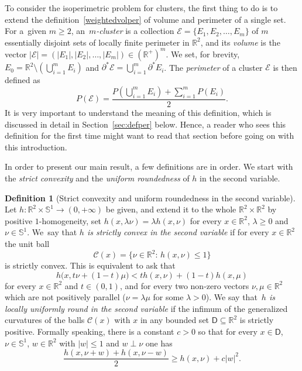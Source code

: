 \documentclass[10pt]{amsart}
\newcommand\R{\mathbb{R}}
\renewcommand\S{\mathbb{S}}
\newcommand\C{\mathcal{C}}
\newcommand\E{\mathcal{E}}
\theoremstyle{plain}
\theoremstyle{definition}
\newtheorem{defn}[thm]{Definition}
\begin{document}
To consider the isoperimetric problem for clusters, the first thing to do is to extend the definition~\eqref{weightedvolper} of volume and perimeter of a single set. For a~given $m\geq 2$, an~\emph{$m$\nobreakdash-cluster} is a collection $\E=\{E_1,E_2,\dots, E_m\}$ of $m$ essentially disjoint sets of local\-ly finite perimeter in $\R^2$, and its \emph{volume} is the vector $|\E|=(|E_1|, |E_2|,\dots, |E_m|)\in (\R^+)^m$. We set, for brevity, $E_0=\R^2\setminus (\bigcup_{i=1}^m E_i)$ and $\partial^* \E=\bigcup_{i=1}^m \partial^* E_i$. The \emph{perimeter} of a cluster $\E$ is then defined as
\begin{equation}\label{PbE}
P(\E) = \frac{P(\bigcup_{i=1}^m E_i) + \sum_{i=1}^m P(E_i) }2 .
\end{equation}
It is very important to understand the meaning of this definition, which is discussed in detail in Section~\ref{sec:defper} below. Hence, a reader who sees this definition for the first time might want to read that section before going on with this introduction.

In order to present our main result, a few definitions are in order. We start with the \emph{strict convexity} and the \emph{uniform roundedness} of $h$ in the second variable.
\begin{defn}[Strict convexity and uniform roundedness in the second variable]\label{strictconv}
Let $h:\R^2\times\S^1\to (0,+\infty)$ be given, and extend it to the whole $\R^2\times\R^2$ by positive $1$-homogeneity, \ie set $h(x,\lambda\nu)=\lambda h(x,\nu)$ for every $x\in\R^2$, $\lambda\geq 0$ and $\nu\in\S^1$. We~say that \emph{$h$ is strictly convex in the second variable} if for every $x\in\R^2$ the unit ball
\begin{equation}\label{unitball}
\C(x) = \big\{ \nu\in\R^2:\, h(x,\nu)\leq 1\big\}
\end{equation}
is strictly convex. This is equivalent to ask that
\[
h\big(x,t\nu+(1-t)\mu\big) < th(x,\nu) + (1-t) h(x,\mu)
\]
for every $x\in\R^2$ and $t\in(0,1)$, and for every two non-zero vectors $\nu,\mu\in\R^2$ which are not positively parallel (\ie $\nu=\lambda\mu$ for some $\lambda>0$). We say that~\emph{$h$ is locally uniformly round in the second variable} if the infimum of the generalized curvatures of the balls $\C(x)$ with $x$ in any bounded set $\mathsf{D}\subseteq\R^2$ is strictly positive. Formally speaking, there is a constant $c>0$ so that for every $x\in \mathsf{D}$, $\nu\in \S^1$, $w\in\R^2$ with $|w|\leq 1$ and $w\perp \nu$ one has\vspace*{-3pt}\enlargethispage{.5\baselineskip}%
\begin{equation}\label{numero}
\frac{h(x,\nu+w) + h(x,\nu-w)}2 \geq h(x,\nu) + c |w|^2.
\end{equation}
\end{defn}
\end{document}
